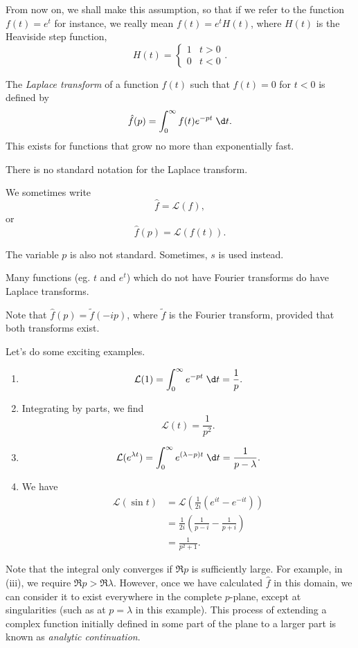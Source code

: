 \documentclass[a4paper]{article}
\begin{document}
From now on, we shall make this assumption, so that if we refer to the function $f(t) = e^t$ for instance, we really mean $f(t) = e^t H(t)$, where $H(t)$ is the Heaviside step function,
\[
  H(t) =
  \begin{cases}
    1 & t > 0\\
    0 & t < 0
  \end{cases}.
\]
\begin{defi}
  The \emph{Laplace transform} of a function $f(t)$ such that $f(t) = 0$ for $t < 0$ is defined by
  \[
    \hat{f}(p) = \int_0^\infty f(t) e^{-pt}\;\d t.
  \]
  This exists for functions that grow no more than exponentially fast.
\end{defi}
There is no standard notation for the Laplace transform.
\begin{notation}
  We sometimes write
  \[
    \hat{f} = \mathcal{L}(f),
  \]
  or
  \[
    \hat{f}(p) = \mathcal{L}(f(t)).
  \]
\end{notation}
The variable $p$ is also not standard. Sometimes, $s$ is used instead.

Many functions (eg. $t$ and $e^t$) which do not have Fourier transforms do have Laplace transforms.

Note that $\hat{f}(p) = \tilde{f}(-ip)$, where $\tilde{f}$ is the Fourier transform, provided that both transforms exist.

\begin{eg}
  Let's do some exciting examples.
  \begin{enumerate}
    \item
      \[
        \mathcal{L}(1) = \int_0^\infty e^{-pt} \;\d t = \frac{1}{p}.
      \]
    \item Integrating by parts, we find
      \[
        \mathcal{L}(t) = \frac{1}{p^2}.
      \]
    \item
      \[
        \mathcal{L}(e^{\lambda t}) = \int_0^\infty e^{(\lambda - p)t}\;\d t = \frac{1}{p - \lambda}.
      \]
    \item We have
      \begin{align*}
        \mathcal{L}(\sin t) &= \mathcal{L}\left(\frac{1}{2i} \left(e^{it} - e^{-it}\right)\right) \\
        &= \frac{1}{2i} \left(\frac{1}{p - i} - \frac{1}{p + i}\right)\\
        &= \frac{1}{p^2 + 1}.
      \end{align*}
  \end{enumerate}
\end{eg}
Note that the integral only converges if $\Re p$ is sufficiently large. For example, in (iii), we require $\Re p > \Re \lambda$. However, once we have calculated $\hat{f}$ in this domain, we can consider it to exist everywhere in the complete $p$-plane, except at singularities (such as at $p = \lambda$ in this example). This process of extending a complex function initially defined in some part of the plane to a larger part is known as \emph{analytic continuation}.
\end{document}
